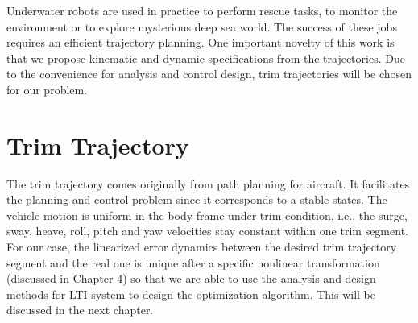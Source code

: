 

Underwater robots are used in practice to perform rescue tasks, to monitor the environment or to explore mysterious deep sea world. The success of these jobs requires an efficient trajectory planning. One important novelty of this work is that we propose kinematic and dynamic specifications from the trajectories. Due to the convenience for analysis and control design, trim trajectories will be chosen for our problem.     
 

\section{Trim Trajectory}
The trim trajectory comes originally from path planning for aircraft. It facilitates the planning and control problem since it corresponds to a stable states. The vehicle motion is uniform in the body frame under trim condition, i.e., the surge, sway, heave, roll, pitch and yaw velocities stay constant within one trim segment. For our case, the linearized error dynamics between the desired trim trajectory segment and the real one is unique after a specific nonlinear transformation (discussed in Chapter 4) so that we are able to use the analysis and design methods for LTI system to design the optimization algorithm. This will be discussed in the next chapter.

